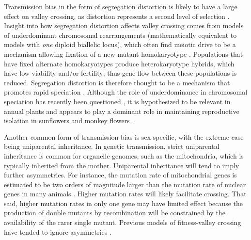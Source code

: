 \documentclass[review,3p,authoryear]{elsarticle}
\begin{document}
Transmission bias in the form of segregation distortion is likely to have a large effect on valley crossing, as distortion represents a second level of selection \citep{Sandler1957,Hartl1970}.
Insight into how segregation distortion affects valley crossing comes from models of underdominant chromosomal rearrangements (mathematically equivalent to models with \textit{one} diploid biallelic locus), which often find meiotic drive to be a mechanism allowing fixation of a new mutant homokaryotype \citep{Bengtsson1976,Hedrick1981,Walsh1982}.
Populations that have fixed alternate homokaryotypes produce heterokaryotype hybrids, which have low viability and/or fertility; thus gene flow between these populations is reduced.
Segregation distortion is therefore thought to be a mechanism that promotes rapid speciation \citep[stasipatric speciation;][]{White1978}.
Although the role of underdominance in chromosomal speciation has recently been questioned \citep[reveiwed in][]{Rieseberg2001,Hoffmann2008c,Faria2010,Kirkpatrick2010}, it is hypothesized to be relevant in annual plants \citep{Hoffmann2008c} and appears to play a dominant role in maintaining reproductive isolation in sunflowers \citep{Lai2005} and monkey flowers \citep{Stathos2014}.

Another common form of transmission bias is sex specific, with the extreme case being uniparental inheritance.
In genetic transmission, strict uniparental inheritance is common for organelle genomes, such as the mitochondria, which is typically inherited from the mother.
Uniparental inheritance will tend to imply further asymmetries.
For instance, the mutation rate of mitochondrial genes is estimated to be two orders of magnitude larger than the mutation rate of nuclear genes in many animals \citep[e.g.,][]{Linnane1989}.
Higher mutation rates will likely facilitate crossing.
That said, higher mutation rates in only one gene may have limited effect because the production of double mutants by recombination will be constrained by the availability of the rarer single mutant.
Previous models of fitness-valley crossing have tended to ignore asymmetries \citep[but see Appendix C of][]{Weissman2010}.
 
\end{document}
